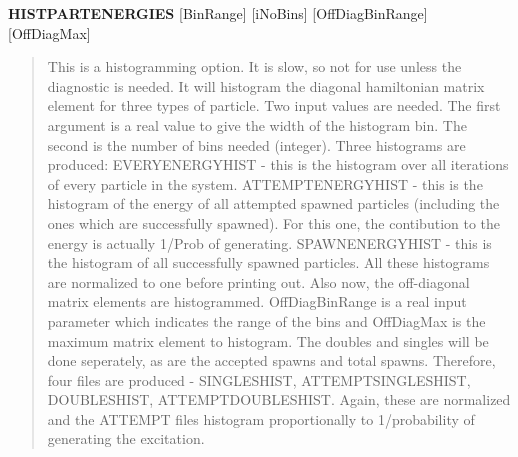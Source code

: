 \documentclass[openany,a4paper,10pt,english]{manual}
\begin{document}
\textbf{HISTPARTENERGIES} {[}BinRange{]} {[}iNoBins{]} {[}OffDiagBinRange{]} {[}OffDiagMax{]}
\begin{quote}

This is a histogramming option. It is slow, so not for use unless the diagnostic is needed. It will histogram
the diagonal hamiltonian matrix element for three types of particle. Two input values are needed. The first
argument is a real value to give the width of the histogram bin. The second is the number of bins needed (integer).
Three histograms are produced: EVERYENERGYHIST - this is the histogram over all iterations of every particle in the
system. ATTEMPTENERGYHIST - this is the histogram of the energy of all attempted spawned particles (including the
ones which are successfully spawned). For this one, the contibution to the energy is actually 1/Prob of generating.
SPAWNENERGYHIST - this is the histogram of all successfully spawned particles. All these histograms are normalized to
one before printing out.
Also now, the off-diagonal matrix elements are histogrammed. OffDiagBinRange is a real input parameter which indicates
the range of the bins and OffDiagMax is the maximum matrix element to histogram. The doubles and singles will be done
seperately, as are the accepted spawns and total spawns. Therefore, four files are produced - SINGLESHIST, ATTEMPTSINGLESHIST,
DOUBLESHIST, ATTEMPTDOUBLESHIST. Again, these are normalized and the ATTEMPT files histogram proportionally to 1/probability
of generating the excitation.
\end{quote}
\end{document}
